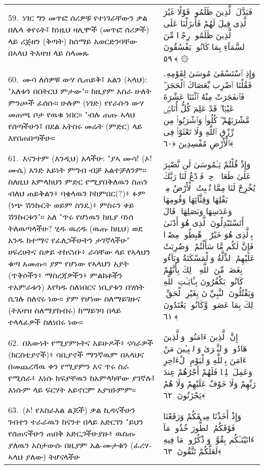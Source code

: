 \documentclass[11pt,a4paper,oneside]{article}%
\newcommand{\mytextarabic}[1]{\textarabic{ #1 \flushright}}
\begin{document}
\begin{longtable}{%
  @{}
    p{}
  @{~~~}
    p{}
    @{}
}
59.\ ነገር ግን መጥፎ ሰሪዎቹ የተነገራቸውን ቃል በሌላ ቀየሩት፤ ከነዚህ ዛሊሞች (መጥፎ ሰሪዎች) ላይ ሪጅዘን (ቅጣት) ከሰማይ አወርድንባቸው በኣላህ ትእዛዝ ላይ ስላመጹ &  \mytextarabic{فَبَدَّلَ ٱلَّذِينَ ظَلَمُوا۟ قَوْلًا غَيْرَ ٱلَّذِى قِيلَ لَهُمْ فَأَنزَلْنَا عَلَى ٱلَّذِينَ ظَلَمُوا۟ رِجْزًۭا مِّنَ ٱلسَّمَآءِ بِمَا كَانُوا۟ يَفْسُقُونَ ﴿٥٩﴾ ۞}\\
60.\ ሙሳ ለሰዎቹ ውሃ ሲጠይቅ፤ አልን (ኣላህ): "አለቱን በበትርህ ምታው"። ከዚያም አስራ ሁለት ምንጮች ፈሰሱ። ሁሉም (ነገድ) የየራሱን ውሃ መጠጫ ቦታ የዉቁ ነበር። "ብሉ ጠጡ ኣላህ የሰጣችሁን፤ በደል አትስሩ መሬት (ምድር) ላይ እየበጠበጣችሁ። &  \mytextarabic{وَإِذِ ٱسْتَسْقَىٰ مُوسَىٰ لِقَوْمِهِۦ فَقُلْنَا ٱضْرِب بِّعَصَاكَ ٱلْحَجَرَ ۖ فَٱنفَجَرَتْ مِنْهُ ٱثْنَتَا عَشْرَةَ عَيْنًۭا ۖ قَدْ عَلِمَ كُلُّ أُنَاسٍۢ مَّشْرَبَهُمْ ۖ كُلُوا۟ وَٱشْرَبُوا۟ مِن رِّزْقِ ٱللَّهِ وَلَا تَعْثَوْا۟ فِى ٱلْأَرْضِ مُفْسِدِينَ ﴿٦٠﴾}\\
61.\ እናንተም (እንዲህ) አላችሁ: "ያኣ ሙሳ! (ኦ! ሙሴ) አንድ አይነት  ምግብ ብቻ አልተቻለንም። ስለዚህ አምላክህን ምድር የሚያበቅለዉን ስጠን ብለህ ጠይቅልን፥ ባቄላዉን ኮከምበር(?)፥ ፉም (ነጭ ሽንኩርት ወይም ስንዴ)፥ ምስሩን ቀይ ሽንኩርቱን"። አለ "ጥሩ የሆነዉን  ከዚያ ባነሰ ትለዉጣላችሁ? ሂዱ ዉረዱ (ዉጡ ከዚህ) ወደ አንዱ ከተማና የፈለጋችሁትን ታገኛላችሁ" ሀፍረሀትና ስቃይ ተከናነቡ፥ ራሳቸው ላይ የኣላህን ቁጣ አመጡ። ያም የሆነው የኣላህን አያት (ጥቅሶችን፥ ማስረጃዎችን፥ ምልክቶችን ተአምራቱን) እየካዱ ስለነበርና ነቢያቱን በሃሰት ሲገሉ ስለኖሩ ነው። ያም የሆነው ስለማይገዙና (ትእዛዝ ስለማያከብሩ) ከማይገባ በላይ ተላላፊዎች ስለነበሩ ነው። &  \mytextarabic{وَإِذْ قُلْتُمْ يَـٰمُوسَىٰ لَن نَّصْبِرَ عَلَىٰ طَعَامٍۢ وَٟحِدٍۢ فَٱدْعُ لَنَا رَبَّكَ يُخْرِجْ لَنَا مِمَّا تُنۢبِتُ ٱلْأَرْضُ مِنۢ بَقْلِهَا وَقِثَّآئِهَا وَفُومِهَا وَعَدَسِهَا وَبَصَلِهَا ۖ قَالَ أَتَسْتَبْدِلُونَ ٱلَّذِى هُوَ أَدْنَىٰ بِٱلَّذِى هُوَ خَيْرٌ ۚ ٱهْبِطُوا۟ مِصْرًۭا فَإِنَّ لَكُم مَّا سَأَلْتُمْ ۗ وَضُرِبَتْ عَلَيْهِمُ ٱلذِّلَّةُ وَٱلْمَسْكَنَةُ وَبَآءُو بِغَضَبٍۢ مِّنَ ٱللَّهِ ۗ ذَٟلِكَ بِأَنَّهُمْ كَانُوا۟ يَكْفُرُونَ بِـَٔايَـٰتِ ٱللَّهِ وَيَقْتُلُونَ ٱلنَّبِيِّۦنَ بِغَيْرِ ٱلْحَقِّ ۗ ذَٟلِكَ بِمَا عَصَوا۟ وَّكَانُوا۟ يَعْتَدُونَ ﴿٦١﴾}\\
62.\ በእውነት የሚያምኑትና አይሁዶች፥ ናሳራዎች  (ክርስቲያኖች)፥ ሳቢያኖች ማንኛዉም በኣላህና በመጨረሻዉ ቀን የሚያምን እና ጥሩ ስራ  የሚሰራ፥ እነሱ ክፍያቸዉን ከአምላካቸው ያገኛሉ፤ እነሱም ላይ ፍርሃት አይኖርም  አያዝኑምም። &  \mytextarabic{ إِنَّ ٱلَّذِينَ ءَامَنُوا۟ وَٱلَّذِينَ هَادُوا۟ وَٱلنَّصَٟرَىٰ وَٱلصَّٟبِـِٔينَ مَنْ ءَامَنَ بِٱللَّهِ وَٱلْيَوْمِ ٱلْءَاخِرِ وَعَمِلَ صَٟلِحًۭا فَلَهُمْ أَجْرُهُمْ عِندَ رَبِّهِمْ وَلَا خَوْفٌ عَلَيْهِمْ وَلَا هُمْ يَحْزَنُونَ ﴿٦٢﴾}\\
63.\ (ኦ! የእስራእል ልጆች) ቃል ኪዳናችሁን ገብተን ተራራዉን ከናንተ በላይ አድርገን "ይህን የሰጠናችሁን ጠበቅ አድርጋችሁያዙ፥ ዉስጡ ያለዉን አስታውሱ  በዚያም አል-ሙታቁን (ፈሪሃ-ኣላህ ያለው)  ትሆናላችሁ &  \mytextarabic{وَإِذْ أَخَذْنَا مِيثَٟقَكُمْ وَرَفَعْنَا فَوْقَكُمُ ٱلطُّورَ خُذُوا۟ مَآ ءَاتَيْنَـٰكُم بِقُوَّةٍۢ وَٱذْكُرُوا۟ مَا فِيهِ لَعَلَّكُمْ تَتَّقُونَ ﴿٦٣﴾}\\

\end{longtable}
\end{document}
